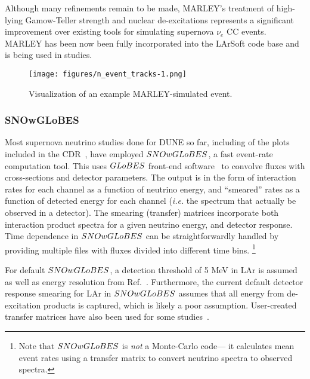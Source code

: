 Although many refinements remain to be made, MARLEY's treatment of high-lying
Gamow-Teller strength and nuclear de-excitations represents a significant
improvement over existing tools for simulating supernova $\nu_e$ CC events.  MARLEY has been now been fully incorporated into the LArSoft code base 
and is being used in studies.


\begin{figure}[htp]
\centering
\texttt{[image: figures/n\_event\_tracks-1.png]}
\caption{Visualization of an example MARLEY-simulated event.}
\label{fig:marleydist}
\end{figure}


\subsubsection{SNOwGLoBES}

Most supernova neutrino studies done for DUNE so far, including of the
plots included in the CDR~\cite{Acciarri:2015uup}, have employed
$SNOwGLoBES$\cite{sglobes}, a fast event-rate computation tool.  This
uses $GLoBES$ front-end software~\cite{Huber:2004ka,globes} to
convolve fluxes with cross-sections and detector parameters.  The
output is in the form of interaction rates for each channel as a
function of neutrino energy, and ``smeared'' rates as a function of
detected energy for each channel (\textit{i.e.} the spectrum that
actually be observed in a detector).  
The smearing (transfer) matrices incorporate both
interaction product spectra for a given neutrino energy, and detector
response. 
Time dependence in $SNOwGLoBES$ can be straightforwardly
handled by providing multiple files with fluxes divided into different
time bins. \footnote{Note that $SNOwGLoBES$ is \textit{not} a Monte-Carlo
code--- it calculates mean event rates using a transfer matrix to
convert neutrino spectra to observed spectra.}

For default $SNOwGLoBES$, a
detection threshold of 5 MeV in LAr is assumed as well as energy resolution
from Ref.~\cite{Amoruso:2003sw}.    Furthermore, the current default detector
response smearing for LAr in $SNOwGLoBES$ assumes that all energy from
de-excitation products is captured, which is likely a poor assumption. 
User-created transfer matrices have also been used
for some studies~\cite{gleb, glebdocdb}.

